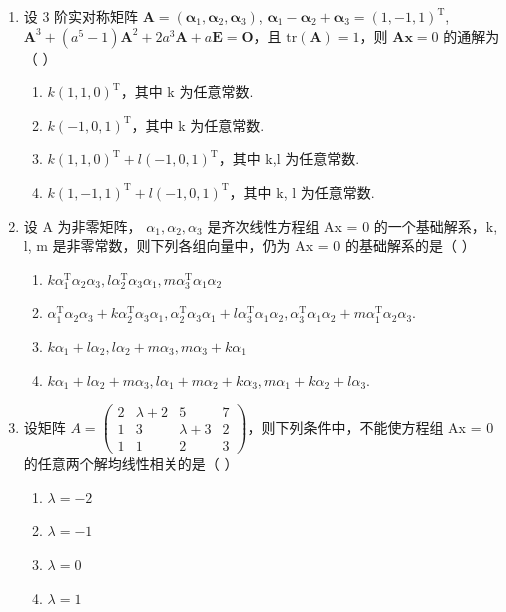 \documentclass[12pt, a4paper]{ctexart}
\begin{document}
\begin{enumerate}
    \item 设 3 阶实对称矩阵 $ \mathbf{A} = (\boldsymbol{\alpha}_1, \boldsymbol{\alpha}_2, \boldsymbol{\alpha}_3) $, $ \boldsymbol{\alpha}_1 - \boldsymbol{\alpha}_2 + \boldsymbol{\alpha}_3 = (1, -1, 1)^\mathrm{T} $, $ \mathbf{A}^3 + (a^5 - 1)\mathbf{A}^2 + 2a^3\mathbf{A} + a\mathbf{E} = \mathbf{O} $，且 $ \mathrm{tr}(\mathbf{A}) = 1 $，则 $ \mathbf{A}\mathbf{x} = 0 $ 的通解为（ \underline{\hspace{1cm}} ）
    \begin{enumerate}[label=(\Alph*)]
        \item $ k(1,1,0)^{\mathrm{T}} $，其中 k 为任意常数.
        \item $ k(-1,0,1)^{\mathrm{T}} $，其中 k 为任意常数.
        \item $ k(1,1,0)^{\mathrm{T}} + l(-1,0,1)^{\mathrm{T}} $，其中 k,l 为任意常数.
        \item $ k(1,-1,1)^{\mathrm{T}} + l(-1,0,1)^{\mathrm{T}} $，其中 k, l 为任意常数.
    \end{enumerate}

    \item 设 A 为非零矩阵， $ \alpha_{1}, \alpha_{2}, \alpha_{3} $ 是齐次线性方程组 Ax = 0 的一个基础解系，k, l, m 是非零常数，则下列各组向量中，仍为 Ax = 0 的基础解系的是（ \underline{\hspace{1cm}} ）
    \begin{enumerate}[label=(\Alph*)]
        \item $ k\alpha_{1}^{\mathrm{T}}\alpha_{2}\alpha_{3}, l\alpha_{2}^{\mathrm{T}}\alpha_{3}\alpha_{1}, m\alpha_{3}^{\mathrm{T}}\alpha_{1}\alpha_{2} $
        \item $ \alpha_{1}^{\mathrm{T}}\alpha_{2}\alpha_{3}+k\alpha_{2}^{\mathrm{T}}\alpha_{3}\alpha_{1},\alpha_{2}^{\mathrm{T}}\alpha_{3}\alpha_{1}+l\alpha_{3}^{\mathrm{T}}\alpha_{1}\alpha_{2},\alpha_{3}^{\mathrm{T}}\alpha_{1}\alpha_{2}+m\alpha_{1}^{\mathrm{T}}\alpha_{2}\alpha_{3}. $
        \item $ k\alpha_{1} + l\alpha_{2}, l\alpha_{2} + m\alpha_{3}, m\alpha_{3} + k\alpha_{1} $
        \item $ k\alpha_{1} + l\alpha_{2} + m\alpha_{3}, l\alpha_{1} + m\alpha_{2} + k\alpha_{3}, m\alpha_{1} + k\alpha_{2} + l\alpha_{3} $.
    \end{enumerate}

    \item 设矩阵 $ A = \begin{pmatrix} 2 & \lambda + 2 & 5 & 7 \\ 1 & 3 & \lambda + 3 & 2 \\ 1 & 1 & 2 & 3 \end{pmatrix} $，则下列条件中，不能使方程组 Ax = 0 的任意两个解均线性相关的是（ \underline{\hspace{1cm}} ）
    \begin{enumerate}[label=(\Alph*)]
        \item $ \lambda = -2 $
        \item $ \lambda = -1 $
        \item $ \lambda = 0 $
        \item $ \lambda = 1 $
    \end{enumerate}


\end{enumerate}
\end{document}

